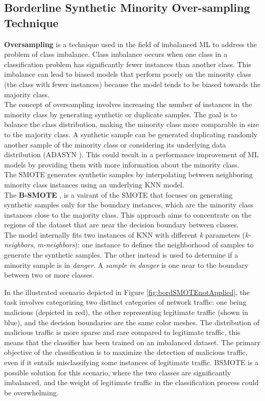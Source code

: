 \subsection{Borderline Synthetic Minority Over-sampling Technique}
\label{subsec:borderline}

\textbf{Oversampling} is a technique used in the field of imbalanced ML to address the problem of class imbalance. 
Class imbalance occurs when one class in a classification problem has significantly fewer instances than another class. 
This imbalance can lead to biased models that perform poorly on the minority class (the class with fewer instances) because the model tends to be biased towards the majority class.\\
The concept of oversampling involves increasing the number of instances in the minority class by generating synthetic or duplicate samples. 
The goal is to balance the class distribution, making the minority class more comparable in size to the majority class. 
A synthetic sample can be generated duplicating randomly another sample of the minority class or considering its underlying data distribution (ADASYN \cite{adasyn:2008}).
This could result in a performance improvement of ML models by providing them with more information about the minority class.\\
The SMOTE generates synthetic samples by interpolating between neighboring minority class instances using an underlying KNN model.\\

The \textbf{B-SMOTE} \cite{Han2005BorderlineSMOTEAN:2005}, is a vairant of the SMOTE that focuses on generating synthetic samples only for the boundary instances, which are the minority class instances close to the majority class. 
This approach aims to concentrate on the regions of the dataset that are near the decision boundary between classes. \\
The model internally fits two instances of KNN with different \textit{k} parameters (\textit{k-neighbors}, \textit{m-neighbors}): one instance to defines the neighborhood of samples to generate the synthetic samples.
The other instead is used to determine if a minority sample is in \textit{danger}. A \textit{sample in danger} is one near to the boundary between two or more classes.

In the illustrated scenario depicted in Figure \ref{fig:bordSMOTEnotApplied}, the task involves categorizing two distinct categories of network traffic: 
one being malicious (depicted in red), the other representing legitimate traffic (shown in blue), and the decision boundaries are the same color meshes.
The distribution of malicious traffic is more sparse and rare compared to legitimate traffic, this means that the classifier has been trained on an imbalanced dataset. 
The primary objective of the classification is to maximize the detection of malicious traffic, even if it entails misclassifying some instances of legitimate traffic. 
BSMOTE is a possible solution for this scenario, where the two classes are significantly imbalanced, and the weight of legitimate traffic in the classification process could be overwhelming.

